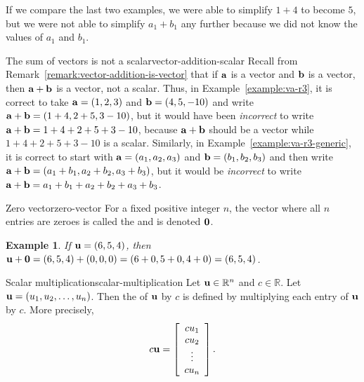 \documentclass{book}
\newcounter{ekcounter}%
\theoremstyle{ekimcustom}
\newtheorem{example}[ekcounter]{Example}
\newcommand\defn[1]{{\color{blue}{\bf #1}}}
\begin{document}
If we compare the last two examples, we were able to simplify $1+4$ to become $5$, but we were not able to simplify $a_1+b_1$ any further because we did not know the values of $a_1$ and $b_1$.
\begin{bwarning}{The sum of vectors is not a scalar}{vector-addition-scalar}
Recall from Remark~\ref{remark:vector-addition-is-vector} that if ${\bf a}$ is a vector and ${\bf b}$ is a vector, then ${\bf a}+{\bf b}$ is a vector, not a scalar.
\vskip6pt
Thus, in Example~\ref{example:va-r3}, it is correct to take ${\bf a} = (1,2,3)$ and ${\bf b}=(4,5,-10)$ and write ${\bf a}+{\bf b} = (1+4,2+5,3-10)$, but it would have been \emph{incorrect} to write ${\bf a}+{\bf b} = 1+4+2+5+3-10$, because ${\bf a}+{\bf b}$ should be a vector while $1+4+2+5+3-10$ is a scalar.
\vskip6pt
Similarly, in Example~\ref{example:va-r3-generic}, it is correct to start with ${\bf a} = (a_1,a_2,a_3)$ and ${\bf b}=(b_1,b_2,b_3)$ and then write ${\bf a}+{\bf b} = (a_1+b_1,a_2+b_2,a_3+b_3)$, but it would be \emph{incorrect} to write ${\bf a}+{\bf b} = a_1+b_1+a_2+b_2+a_3+b_3$.
\end{bwarning}
\begin{bdefinition}{Zero vector}{zero-vector}
For a fixed positive integer $n$, the vector where all $n$ entries are zeroes is called the \defn{zero vector} and is denoted ${\bf 0}$.
\end{bdefinition}
\begin{example}
If ${\bf u} = (6,5,4)$, then ${\bf u}+{\bf 0} = (6,5,4)+(0,0,0) = (6+0,5+0,4+0) = (6,5,4)$.
\end{example}



\begin{bdefinition}{Scalar multiplication}{scalar-multiplication}
Let ${\bf u} \in \mathbb{R}^n$ and $c \in \mathbb{R}$. Let ${\bf u} = (u_1,u_2,\dots,u_n)$. Then the \defn{scalar multiple} of ${\bf u}$ by $c$ is defined by multiplying each entry of ${\bf u}$ by $c$. More precisely,
\[ c{\bf u} 
= \left[ \begin{array}{c}
cu_1  \\
cu_2  \\
\vdots\\
cu_n 
\end{array}\right].\]
\end{bdefinition}
\end{document}
